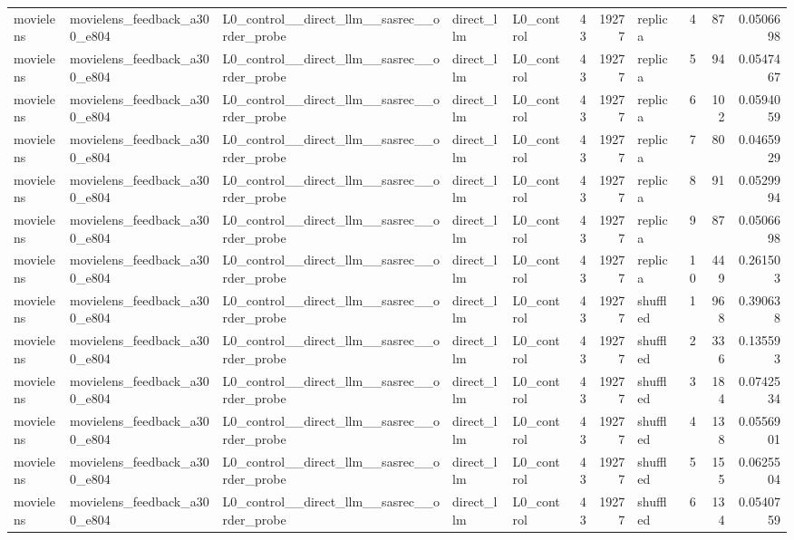 \begin{table}[htbp!]
\begin{tabular}{lllllrrlrrr}
movielens & movielens\_feedback\_a300\_e804 & L0\_control\_\_direct\_llm\_\_sasrec\_\_order\_probe & direct\_llm & L0\_control & 43 & 19277 & replica & 4 & 87 & 0.0506698 \\
movielens & movielens\_feedback\_a300\_e804 & L0\_control\_\_direct\_llm\_\_sasrec\_\_order\_probe & direct\_llm & L0\_control & 43 & 19277 & replica & 5 & 94 & 0.0547467 \\
movielens & movielens\_feedback\_a300\_e804 & L0\_control\_\_direct\_llm\_\_sasrec\_\_order\_probe & direct\_llm & L0\_control & 43 & 19277 & replica & 6 & 102 & 0.0594059 \\
movielens & movielens\_feedback\_a300\_e804 & L0\_control\_\_direct\_llm\_\_sasrec\_\_order\_probe & direct\_llm & L0\_control & 43 & 19277 & replica & 7 & 80 & 0.0465929 \\
movielens & movielens\_feedback\_a300\_e804 & L0\_control\_\_direct\_llm\_\_sasrec\_\_order\_probe & direct\_llm & L0\_control & 43 & 19277 & replica & 8 & 91 & 0.0529994 \\
movielens & movielens\_feedback\_a300\_e804 & L0\_control\_\_direct\_llm\_\_sasrec\_\_order\_probe & direct\_llm & L0\_control & 43 & 19277 & replica & 9 & 87 & 0.0506698 \\
movielens & movielens\_feedback\_a300\_e804 & L0\_control\_\_direct\_llm\_\_sasrec\_\_order\_probe & direct\_llm & L0\_control & 43 & 19277 & replica & 10 & 449 & 0.261503 \\
movielens & movielens\_feedback\_a300\_e804 & L0\_control\_\_direct\_llm\_\_sasrec\_\_order\_probe & direct\_llm & L0\_control & 43 & 19277 & shuffled & 1 & 968 & 0.390638 \\
movielens & movielens\_feedback\_a300\_e804 & L0\_control\_\_direct\_llm\_\_sasrec\_\_order\_probe & direct\_llm & L0\_control & 43 & 19277 & shuffled & 2 & 336 & 0.135593 \\
movielens & movielens\_feedback\_a300\_e804 & L0\_control\_\_direct\_llm\_\_sasrec\_\_order\_probe & direct\_llm & L0\_control & 43 & 19277 & shuffled & 3 & 184 & 0.0742534 \\
movielens & movielens\_feedback\_a300\_e804 & L0\_control\_\_direct\_llm\_\_sasrec\_\_order\_probe & direct\_llm & L0\_control & 43 & 19277 & shuffled & 4 & 138 & 0.0556901 \\
movielens & movielens\_feedback\_a300\_e804 & L0\_control\_\_direct\_llm\_\_sasrec\_\_order\_probe & direct\_llm & L0\_control & 43 & 19277 & shuffled & 5 & 155 & 0.0625504 \\
movielens & movielens\_feedback\_a300\_e804 & L0\_control\_\_direct\_llm\_\_sasrec\_\_order\_probe & direct\_llm & L0\_control & 43 & 19277 & shuffled & 6 & 134 & 0.0540759 \\

\end{tabular}
\end{table}
